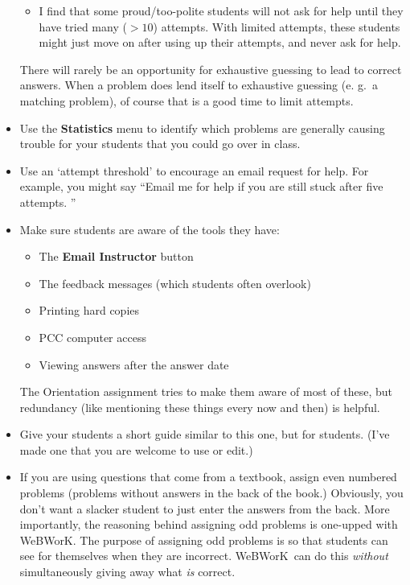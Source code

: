 \documentclass[12pt]{article}
\newcommand{\menu}[1]{\textbf{#1}}
\newcommand{\WW}{WeBWorK}
\begin{document}
\begin{itemize}
\begin{itemize}
		      \item I find that some proud/too-polite students will not ask for help until they have tried many ($>\!\!10$) attempts.
		            With limited attempts, these students might just move on after using up their attempts, and never ask for help.

	      \end{itemize}

	      There will rarely be an opportunity for exhaustive guessing to lead to correct answers.
	      When a problem does lend itself to exhaustive guessing (e.
	      g.\ a matching problem), of course that is a good time to limit attempts.

	\item Use the \menu{Statistics} menu to identify which problems are generally causing trouble for your students that you could go over in class.

	\item Use an `attempt threshold' to encourage an email request for help.
	      For example, you might say ``Email me for help if you are still stuck after five attempts.
	      ''

	\item Make sure students are aware of the tools they have:
	      \begin{itemize}
		      \item The \menu{Email Instructor} button
		      \item The feedback messages (which students often overlook)
		      \item Printing hard copies
		      \item PCC computer access
		      \item Viewing answers after the answer date
	      \end{itemize}
	      The Orientation assignment tries to make them aware of most of these, but redundancy (like mentioning these things every now and then) is helpful.

	\item Give your students a short guide similar to this one, but for students.  (I've made one that you are welcome to use or edit.)

	\item If you are using questions that come from a textbook, assign even numbered problems (problems without answers in the back of the book.)  Obviously, you don't want a slacker student to just enter the answers from the back.
	      More importantly, the reasoning behind assigning odd problems is one-upped with \WW.
	      The purpose of assigning odd problems is so that students can see for themselves when they are incorrect.
	      \WW\ can do this \emph{without} simultaneously giving away what \emph{is} correct.


\end{itemize}
\end{document}
